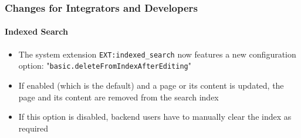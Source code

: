 %

\begin{frame}[fragile]
	\frametitle{Changes for Integrators and Developers}
	\framesubtitle{Indexed Search}


	\begin{itemize}
		\item The system extension \texttt{EXT:indexed\_search} now features
			a new configuration option:
			\small"\texttt{basic.deleteFromIndexAfterEditing}"\normalsize
		\item If enabled (which is the default) and a page or its content is
			updated, the page and its content are removed from the search index
		\item If this option is disabled, backend users have to manually clear
			the index as required
	\end{itemize}

\end{frame}

